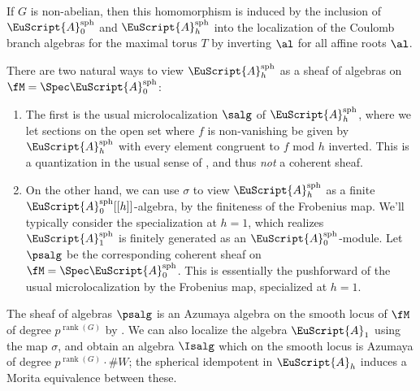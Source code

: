 If $G$ is non-abelian, then this homomorphism is induced by the
inclusion of $\EuScript{A}_0^{\operatorname{sph}}$ and $\EuScript{A}_h^{\operatorname{sph}}$ into the
localization of the Coulomb branch algebras for the maximal torus $T$ by inverting $\al$ for all affine
roots $\al$.  

There are two natural ways to view $\EuScript{A}_h^{\operatorname{sph}}$ as a sheaf of algebras on $\fM=\Spec \EuScript{A}_0^{\operatorname{sph}}$:
\begin{enumerate}
\item The first is the usual microlocalization $\salg$ of
  $\EuScript{A}_h^{\operatorname{sph}}$, where we let sections on the
  open set where $f$ is non-vanishing be given by
  $\EuScript{A}_h^{\operatorname{sph}}$ with every element congruent
  to $f$ mod $h$ inverted.  This is a quantization in the usual sense
  of \cite{BKpos}, and thus {\it not} a coherent sheaf.

\item On the other hand, we can use $\sigma$ to view  $\EuScript{A}_h^{\operatorname{sph}}$ as a finite $\EuScript{A}_0^{\operatorname{sph}}[[h]]$-algebra, by the finiteness of the Frobenius map.  We'll typically consider the specialization at
$h=1$, which realizes $\EuScript{A}_1^{\operatorname{sph}}$ is finitely generated as an $\EuScript{A}_0^{\operatorname{sph}}$-module.  Let $\psalg$ be the corresponding coherent sheaf on $\fM=\Spec \EuScript{A}_0^{\operatorname{sph}}$.  This is essentially the 
pushforward of the usual microlocalization by the
Frobenius map, specialized at $h=1$.
\end{enumerate}


The sheaf of algebras $\psalg$ is an Azumaya
algebra on the smooth locus of $\fM$  of degree $p^{\operatorname{rank}(G)}$ by \cite[Lemma 3.2]{BKpos}.  We can also localize the algebra $\EuScript{A}_1$ using the map $\sigma$, and obtain an algebra $\Isalg$ which on the smooth locus is Azumaya of degree $p^{\operatorname{rank}(G)}\cdot \#W$; the spherical idempotent in $\EuScript{A}_h$ induces a Morita equivalence between these.


